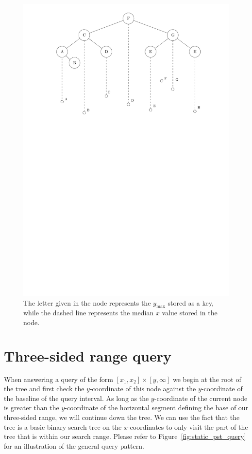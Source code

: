 \documentclass[twoside,11pt,openright]{report}
\begin{document}
\begin{figure}[h]
	\centering
	\includegraphics[scale=0.68]{../figures/internal_pst_static}
	\caption{The letter given in the node represents the $y_{\text{max}}$ stored as a key, while the dashed line represents the median $x$ value stored in the node.}
	\label{fig:static_pst}
\end{figure}

\section{Three-sided range query}
When answering a query of the form $[x_1,x_2] \times [y,\infty]$ we begin at the root of the tree and first check the $y$-coordinate of this node against the $y$-coordinate of the baseline of the query interval. As long as the $y$-coordinate of the current node is greater than the $y$-coordinate of the horizontal segment defining the base of our three-sided range, we will continue down the tree. We can use the fact that the tree is a basic binary search tree on the $x$-coordinates to only visit the part of the tree that is within our search range. Please refer to Figure~\ref{fig:static_pst_query} for an illustration of the general query pattern.
\end{document}
